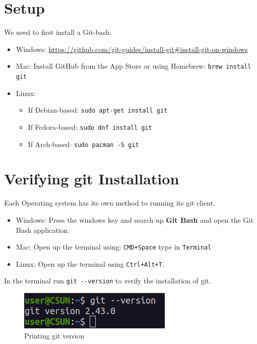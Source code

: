 \documentclass[12pt, a4paper]{article}
\begin{document}
\section{Setup}
We need to first install a Git-bash:\\

\begin{itemize}
    \item Windows: \url{https://github.com/git-guides/install-git#install-git-on-windows}\\
    \item Mac: Install GitHub from the App Store or using Homebrew:
\verb+brew install git+\\
\item Linux:
    \begin{itemize}
        \item If Debian-based: \verb`sudo apt-get install git` \\
        \item If Fedora-based: \verb`sudo dnf install git`\\
        \item If Arch-based: \verb+sudo pacman -S git+ 
    \end{itemize}
\end{itemize}

\section{Verifying git Installation}

Each Operating system has its own method to running its git client. 
\begin{itemize}
\item Windows: Press the windows key and search up \textbf{Git Bash} and open the Git Bash application.
\item Mac: Open up the terminal using: \texttt{CMD+Space} type in \texttt{Terminal}
\item Linux: Open up the terminal using \texttt{Ctrl+Alt+T}.
\end{itemize}

In the terminal run \verb+git --version+ to verify the installation of git.
\begin{figure}[H]
\centering
\includegraphics[scale=0.75]{../images/workshop-I/git-ver.png}
\caption{Printing git version}
\end{figure}
\end{document}
